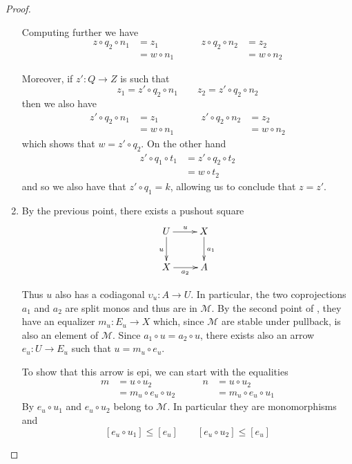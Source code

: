 \documentclass[a4paper]{article}
\theoremstyle{definition}
\begin{document}
\begin{proof}
\begin{enumerate}
Computing further we have
		\[\begin{split}
		z\circ q_2\circ n_1&=z_1\\&=w\circ n_1
		\end{split}\qquad 
		\begin{split}
			z\circ q_2\circ n_2&=z_2\\&=w\circ n_2
		\end{split}\]
		
		Moreover, if $z'\colon Q\to Z$ is such that
		\[z_1=z'\circ q_2\circ n_1 \qquad z_2=z'\circ q_2\circ n_2\]
		then we also have 
		\[\begin{split}
			z'\circ q_2\circ n_1&=z_1\\
			&=w\circ n_1 
		\end{split}\qquad \begin{split}
			z'\circ q_2\circ n_2&=z_2\\
			&=w\circ n_2
		\end{split}\]
		which shows that $w=z'\circ q_2$. On the other hand
		\[\begin{split}
			z'\circ q_1\circ t_1 & = z'\circ q_2\circ t_2\\&=w\circ t_2
		\end{split}\]
		and so we also have that $z'\circ q_1=k$, allowing us to conclude that $z=z'$. 
		
		\item By the previous point, there exists a pushout square		
		\[\xymatrix{U \ar[r]^{u} \ar[d]_{u}& X \ar[d]^{a_1} \\ X \ar[r]_{a_2}  & A}\]
		
		Thus $u$ also has a codiagonal $\upsilon_{u}\colon A\to U$. In particular, the two coprojections $a_1$ and $a_2$  are split monos and thus are in $\mathcal{M}$. By the second point of , they have an equalizer $m_u\colon E_u\to X$ which, since $\mathcal{M}$ are stable under pullback, is also an element of $\mathcal{M}$. Since $a_1\circ u= a_2\circ u$, there exists also an arrow $e_u\colon U\to E_u$ such that $u=m_u\circ e_u$. 
		
		To show that this arrow is epi, we can start with the equalities
		\[\begin{split}
			m&=u\circ u_2\\&=m_u\circ e_u\circ u_2
		\end{split} \qquad \begin{split}
			n&=u\circ u_2\\&=m_u\circ e_u\circ u_1
		\end{split}  \]
		By   $e_u\circ u_1$ and $e_u\circ u_2$ belong to $\mathcal{M}$. In particular they are monomorphisms and
		\[[e_u\circ u_1] \leq [e_u] \qquad [e_u\circ u_2] \leq [e_u]\]
		

\end{enumerate}
\end{proof}
\end{document}
